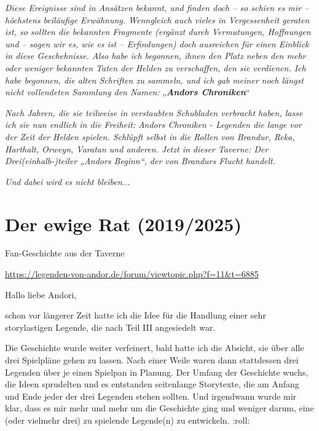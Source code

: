 {

\textit{Diese Ereignisse sind in Ansätzen bekannt, und finden doch – so schien es mir – höchstens beiläufige Erwähnung. Wenngleich auch vieles in Vergessenheit geraten ist, so sollten die bekannten Fragmente (ergänzt durch Vermutungen, Hoffnungen und – sagen wir es, wie es ist – Erfindungen) doch ausreichen für einen Einblick in diese Geschehnisse. Also habe ich begonnen, ihnen den Platz neben den mehr oder weniger bekannten Taten der Helden zu verschaffen, den sie verdienen. Ich habe begonnen, die alten Schriften zu sammeln, und ich gab meiner noch längst nicht vollendeten Sammlung den Namen:} „\textit{\textbf{Andors Chroniken}}“


\textit{Nach Jahren, die sie teilweise in verstaubten Schubladen verbracht haben, lasse ich sie nun endlich in die Freiheit:}
\textit{Andors Chroniken - Legenden die lange vor der Zeit der Helden spielen. Schlüpft selbst in die Rollen von Brandur, Reka, Harthalt, Orweyn, Varatan und anderen. Jetzt in dieser Taverne: Der Drei(einhalb-)teiler „Andors Beginn“, der von Brandurs Flucht handelt.}

\textit{Und dabei wird es nicht bleiben...}






\newpage
\section{Der ewige Rat (2019/2025)}

\begin{center}
    Fan-Geschichte aus der Taverne

    \url{https://legenden-von-andor.de/forum/viewtopic.php?f=11&t=6885}
\end{center}


Hallo liebe Andori,\bigskip

schon vor längerer Zeit hatte ich die Idee für die Handlung einer sehr storylastigen Legende, die nach Teil III angesiedelt war.

Die Geschichte wurde weiter verfeinert, bald hatte ich die Absicht, sie über alle drei Spielpläne gehen zu lassen. Nach einer Weile waren dann stattdessen drei Legenden über je einen Spielpan in Planung. Der Umfang der Geschichte wuchs, die Ideen sprudelten und es entstanden seitenlange Storytexte, die am Anfang und Ende jeder der drei Legenden stehen sollten. Und irgendwann wurde mir klar, dass es mir mehr und mehr um die Geschichte ging und weniger darum, eine (oder vielmehr drei) zu spielende Legende(n) zu entwickeln. :roll:

}
